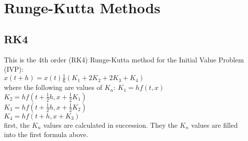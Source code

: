 \section{Runge-Kutta Methods}
\subsection*{RK4}
This is the 4th order (RK4) Runge-Kutta
method for the Initial Value Problem (IVP):\\
$x(t+h) = x(t) \frac{1}{6}( K_1  + 2K_2 + 2K_3 + K_4) $\\
where the following are values of $K_n$:
$ K_1 = h f(t,x)    $\\
$ K_2 = h f(t + \frac{1}{2} h , x + \frac{1}{2} K_1)    $\\
$ K_3 = h f(t + \frac{1}{2} h , x + \frac{1}{2} K_2)    $\\
$ K_4 = h f(t + h ,x + K_3)    $\\
first, the $K_n$ values are calculated in succession. They the $K_n$
values are filled into the first formula above.
